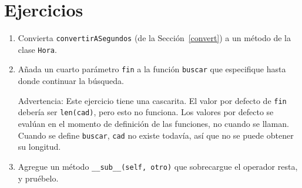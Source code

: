 \section{Ejercicios}
\begin{enumerate}

\item Convierta \texttt{convertirASegundos} 
(de la Sección~\ref{convert}) a un método de la clase
\texttt{Hora}.

\item Añada un cuarto parámetro \texttt{fin} a la función \texttt{buscar} que 
especifique hasta donde continuar la búsqueda.

Advertencia: Este ejercicio tiene una cascarita. El valor por defecto de
\texttt{fin} debería ser \texttt{len(cad)}, pero esto no funciona.  Los
valores por defecto se evalúan en el momento de definición de las funciones, 
no cuando se llaman. Cuando se define \texttt{buscar}, \texttt{cad} no 
existe todavía, así que no se puede obtener su longitud.

\item Agregue un método  \texttt{\_\_sub\_\_(self, otro)} que
sobrecargue el operador resta, y pruébelo.

\end{enumerate}
